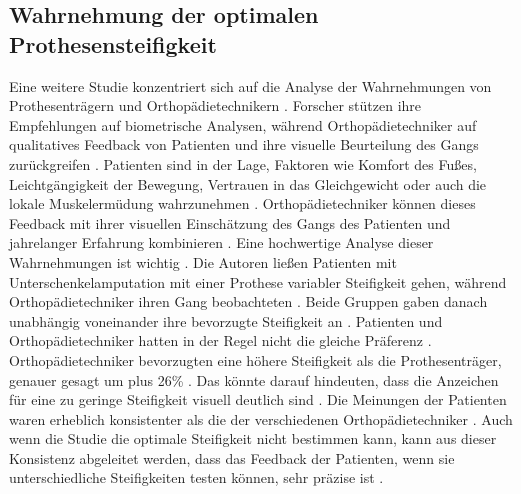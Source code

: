 \subsection{Wahrnehmung der optimalen Prothesensteifigkeit} %
Eine weitere Studie konzentriert sich auf die Analyse der Wahrnehmungen von Prothesenträgern und Orthopädietechnikern \cite{Shepherd.2020}. Forscher stützen ihre Empfehlungen auf biometrische Analysen, während Orthopädietechniker auf qualitatives Feedback von Patienten und ihre visuelle Beurteilung des Gangs zurückgreifen \cite{Shepherd.2020}. Patienten sind in der Lage, Faktoren wie Komfort des Fußes, Leichtgängigkeit der Bewegung, Vertrauen in das Gleichgewicht oder auch die lokale Muskelermüdung wahrzunehmen \cite{Shepherd.2020}. Orthopädietechniker können dieses Feedback mit ihrer visuellen Einschätzung des Gangs des Patienten und jahrelanger Erfahrung kombinieren \cite{Shepherd.2020}. Eine hochwertige Analyse dieser Wahrnehmungen ist wichtig \cite{Shepherd.2020}. Die Autoren ließen Patienten mit Unterschenkelamputation mit einer Prothese variabler Steifigkeit gehen, während Orthopädietechniker ihren Gang beobachteten \cite{Shepherd.2020}. Beide Gruppen gaben danach unabhängig voneinander ihre bevorzugte Steifigkeit an \cite{Shepherd.2020}.
Patienten und Orthopädietechniker hatten in der Regel nicht die gleiche Präferenz \cite{Shepherd.2020}. Orthopädietechniker bevorzugten eine höhere Steifigkeit als die Prothesenträger, genauer gesagt um plus 26\% \cite{Shepherd.2020}. Das könnte darauf hindeuten, dass die Anzeichen für eine zu geringe Steifigkeit visuell deutlich sind \cite{Shepherd.2020}.
Die Meinungen der Patienten waren erheblich konsistenter als die der verschiedenen Orthopädietechniker \cite{Shepherd.2020}. Auch wenn die Studie die optimale Steifigkeit nicht bestimmen kann, kann aus dieser Konsistenz abgeleitet werden, dass das Feedback der Patienten, wenn sie unterschiedliche Steifigkeiten testen können, sehr präzise ist \cite{Shepherd.2020}.

